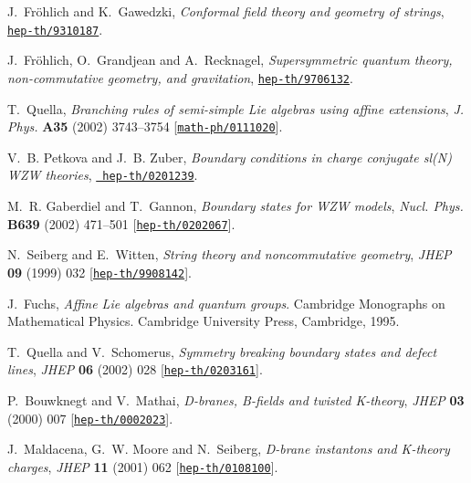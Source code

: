 \documentclass[12pt,a4paper]{article}
\begin{document}
\begin{thebibliography}{10}
J.~{Fr\"ohlich} and K.~Gawedzki, {\it Conformal field theory and geometry of
  strings},  \href{http://arXiv.org/abs/hep-th/9310187}{{\tt hep-th/9310187}}.

J.~{Fr\"ohlich}, O.~Grandjean and A.~Recknagel, {\it Supersymmetric quantum
  theory, non-commutative geometry, and gravitation},
  \href{http://arXiv.org/abs/hep-th/9706132}{{\tt hep-th/9706132}}.

T.~Quella, {\it Branching rules of semi-simple {Lie} algebras using affine
  extensions},  {\em J. Phys.} {\bf A35} (2002) 3743--3754
  [\href{http://arXiv.org/abs/math-ph/0111020}{{\tt math-ph/0111020}}].

V.~B. Petkova and J.~B. Zuber, {\it Boundary conditions in charge conjugate
  {sl(N)} {WZW} theories},  \href{http://arXiv.org/abs/hep-th/0201239}{{\tt
  hep-th/0201239}}.

M.~R. Gaberdiel and T.~Gannon, {\it Boundary states for {WZW} models},  {\em
  Nucl. Phys.} {\bf B639} (2002) 471--501
  [\href{http://arXiv.org/abs/hep-th/0202067}{{\tt hep-th/0202067}}].

N.~Seiberg and E.~Witten, {\it String theory and noncommutative geometry},
  {\em JHEP} {\bf 09} (1999) 032
  [\href{http://arXiv.org/abs/hep-th/9908142}{{\tt hep-th/9908142}}].

J.~Fuchs, {\em {Affine Lie algebras and quantum groups}}.
\newblock Cambridge Monographs on Mathematical Physics. Cambridge University
  Press, Cambridge, 1995.

T.~Quella and V.~Schomerus, {\it Symmetry breaking boundary states and defect
  lines},  {\em JHEP} {\bf 06} (2002) 028
  [\href{http://arXiv.org/abs/hep-th/0203161}{{\tt hep-th/0203161}}].

P.~Bouwknegt and V.~Mathai, {\it {D-branes}, {B-fields} and twisted
  {K-theory}},  {\em JHEP} {\bf 03} (2000) 007
  [\href{http://arXiv.org/abs/hep-th/0002023}{{\tt hep-th/0002023}}].

J.~Maldacena, G.~W. Moore and N.~Seiberg, {\it D-brane instantons and
  {K-theory} charges},  {\em JHEP} {\bf 11} (2001) 062
  [\href{http://arXiv.org/abs/hep-th/0108100}{{\tt hep-th/0108100}}].


\end{thebibliography}
\end{document}

